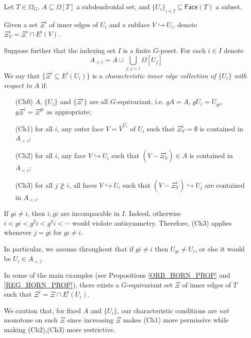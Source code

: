 \documentclass[a4paper,10pt
,draft
]{article}%
\begin{document}
\begin{definition}\label{CHAREDGE DEF}
      Let $T \in \Omega_G$, $A \subseteq \Omega[T]$ a subdendroidal set, and $\{U_i\}_{i \in I} \subseteq \mathsf{Face}(T)$ a subset.

      Given a set $\Xi^i$ of inner edges of $U_i$ and a subface $V \hookrightarrow U_i$, denote $\Xi_V^i = \Xi^i \cap E^{\mathsf{i}}(V)$.

      Suppose further that the indexing set $I$ is a 
      finite $G$-poset. For each $i \in I$ denote
      \[
            A_{<i} = A \cup \bigcup_{j \colon j<i} \Omega[U_j]
      \]
      We say that $\{\Xi^i \subseteq E^{\mathsf{i}}(U_i)\}$ 
      is a \textit{characteristic inner edge collection of $\{U_i\}$ with respect to $A$} if:
      \begin{itemize}
      \item[(Ch0)] $A$, $\{U_i\}$ and $\{\Xi^i\}$ are all $G$-equivariant, i.e. $g A = A$, $g U_i = U_{gi}$, $g \Xi^i = \Xi^{gi}$ as appropriate; 
      \item[(Ch1)] for all $i$, any outer face $V = \bar{V}^{U_i}$
            of $U_i$ such that $\Xi_{V}^i = \emptyset$
            is contained in $A_{<i}$;
      \item[(Ch2)] for all $i$, any face
            $V \hookrightarrow U_i$ such that $(V-\Xi_V^i) \in A$
            is contained in $A_{<i}$;
      \item[(Ch3)] for all $j \not \geq i$, 
            all faces $V \hookrightarrow U_i$ such that 
            $(V-\Xi^i_V) \hookrightarrow U_j$
            are contained in $A_{<i}$.
      \end{itemize}
\end{definition}


\begin{remark}\label{XIIII REM}
If $g i \neq i$, then $i,g i$ are incomparable in $I$. Indeed, otherwise $i<gi<g^2i<g^3i<\cdots$ would violate antisymmetry.
Therefore, (Ch3) applies whenever $j=gi$ for $gi\neq i$.

In particular, we assume throughout that if
$gi \neq i$ then $U_{gi} \neq U_i$,
or else it would be $U_i \in A_{<i}$.
\end{remark}


\begin{remark}\label{SOMEMAIN REM}
In some of the main examples (see Propositions \ref{ORB_HORN_PROP} and \ref{REG_HORN_PROP}), there exists a $G$-equivariant set 
$\Xi$ of inner edges of $T$ such that $\Xi^i = \Xi \cap E^{\mathsf{i}}(U_i)$.

	
We caution that, for fixed $A$ and $\{U_i\}$, our characteristic conditions are \textit{not} monotone on such $\Xi$ since increasing $\Xi$ makes (Ch1) more permissive while making (Ch2),(Ch3) more restrictive.
\end{remark}
\end{document}

